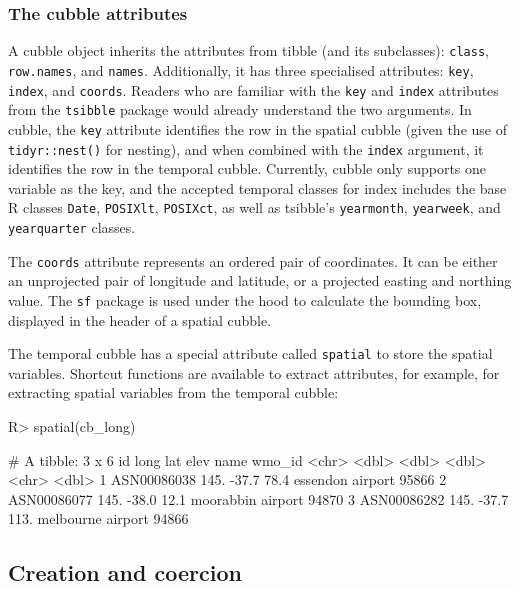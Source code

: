 \documentclass[
]{jss}
\begin{document}
\hypertarget{the-cubble-attributes}{%
\subsubsection{The cubble attributes}\label{the-cubble-attributes}}

A cubble object inherits the attributes from tibble (and its
subclasses): \texttt{class}, \texttt{row.names}, and \texttt{names}.
Additionally, it has three specialised attributes: \texttt{key},
\texttt{index}, and \texttt{coords}. Readers who are familiar with the
\texttt{key} and \texttt{index} attributes from the \texttt{tsibble}
package would already understand the two arguments. In cubble, the
\texttt{key} attribute identifies the row in the spatial cubble (given
the use of \texttt{tidyr::nest()} for nesting), and when combined with
the \texttt{index} argument, it identifies the row in the temporal
cubble. Currently, cubble only supports one variable as the key, and the
accepted temporal classes for index includes the base R classes
\texttt{Date}, \texttt{POSIXlt}, \texttt{POSIXct}, as well as tsibble's
\texttt{yearmonth}, \texttt{yearweek}, and \texttt{yearquarter} classes.

The \texttt{coords} attribute represents an ordered pair of coordinates.
It can be either an unprojected pair of longitude and latitude, or a
projected easting and northing value. The \texttt{sf} package is used
under the hood to calculate the bounding box, displayed in the header of
a spatial cubble.

The temporal cubble has a special attribute called \texttt{spatial} to
store the spatial variables. Shortcut functions are available to extract
attributes, for example,  for extracting spatial
variables from the temporal cubble:

\begin{CodeChunk}
\begin{CodeInput}
R> spatial(cb_long)
\end{CodeInput}
\begin{CodeOutput}
# A tibble: 3 x 6
  id           long   lat  elev name              wmo_id
  <chr>       <dbl> <dbl> <dbl> <chr>              <dbl>
1 ASN00086038  145. -37.7  78.4 essendon airport   95866
2 ASN00086077  145. -38.0  12.1 moorabbin airport  94870
3 ASN00086282  145. -37.7 113.  melbourne airport  94866
\end{CodeOutput}
\end{CodeChunk}

\hypertarget{create}{%
\subsection{Creation and coercion}\label{create}}
\end{document}
